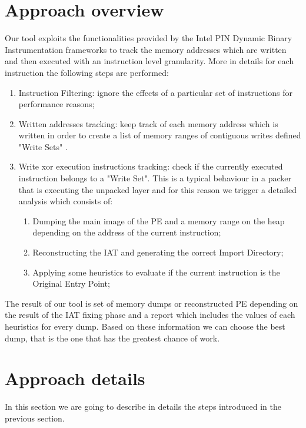 \section{Approach overview}
Our tool exploits the functionalities provided by the Intel PIN Dynamic Binary Instrumentation frameworks to track the memory addresses which are written and then executed with an instruction level granularity.
More in details for each instruction the following steps are performed:
\begin{enumerate}
\item Instruction Filtering: ignore the effects of a particular set of instructions for performance reasons;
\item Written addresses tracking: keep track of each memory address which is written in order to create a list of memory ranges of contiguous writes defined "Write Sets" .
\item Write xor execution instructions tracking: check if the currently executed instruction belongs to a "Write Set". This is a typical behaviour in a packer that is executing the unpacked layer and for this reason we trigger a detailed analysis which consists of:
	\begin{enumerate}
	\item Dumping the main image of the PE and a memory range on the heap depending on the address of the current instruction;
	\item Reconstructing the IAT and generating the correct  Import Directory;
	\item Applying some heuristics to evaluate if the current instruction is the Original Entry Point;
	\end{enumerate}
\end{enumerate}
The result of our tool is set of memory dumps or reconstructed PE depending on the result of the IAT fixing phase and a report which includes the values of each heuristics for every dump. Based on these information we can choose the best dump, that is the one that has the greatest chance of work.\\

\section{Approach details}
In this section we are going to describe in details the steps introduced in the previous section.

